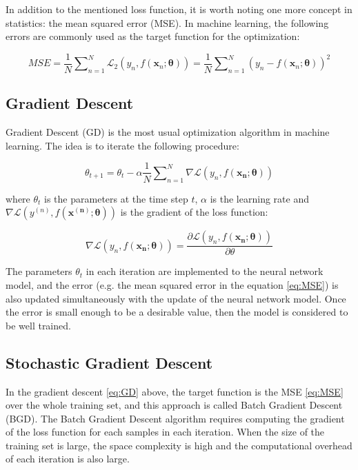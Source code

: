\documentclass[
	parskip, 			   %
	twoside, 			   %
	DIV=14, 			   %
	BCOR=15.0mm, 		   %
	headsepline, 		   %
	open=right, 		   %
	captions=tableheading, %
	bibliography=totoc,    %
	numbers=noenddot       %
]{scrreprt}
\begin{document}
In addition to the mentioned loss function, it is worth noting one more concept in statistics: the mean squared error (MSE). In machine learning, the following errors are commonly used as the target function for the optimization:

\begin{equation}
    \label{eq:MSE}
    MSE = \frac{1}{N} \sum\nolimits_{n=1}^N \mathcal{L}_{2}\left( y_n,f(\mathbf{x}_n;\mathbf{\theta}) \right) = \frac{1}{N} \sum\nolimits_{n=1}^N (y_n-f(\mathbf{x}_n;\mathbf{\theta}))^2
\end{equation}
\subsection{Gradient Descent}
Gradient Descent (GD) is the most usual optimization algorithm in machine learning. The idea is to iterate the following procedure:

\begin{equation}
    \label{eq:GD}
    \theta_{t+1} = \theta_{t} - \alpha \frac{1}{N} \sum\nolimits_{n=1}^N \nabla \mathcal{L}\left( y_{n},f(\mathbf{x_{n}};\mathbf{\theta}) \right)
\end{equation}

where $\theta_{t}$ is the parameters at the time step $t$, $\alpha$ is the learning rate and $\nabla \mathcal{L}\left( y^{(n)},f(\mathbf{x^{(n)}};\mathbf{\theta}) \right)$ is the gradient of the loss function:

\begin{equation}
    \label{eq:Gradient_loss}
    \nabla \mathcal{L}\left( y_{n},f(\mathbf{x_{n}};\mathbf{\theta}) \right) = \frac{\partial \mathcal{L}\left( y_{n},f(\mathbf{x_{n}};\mathbf{\theta}) \right)}{\partial \theta}
\end{equation}

The parameters $\theta_{t}$ in each iteration are implemented to the neural network model, and the error (e.g. the mean squared error in the equation \ref{eq:MSE}) is also updated simultaneously with the update of the neural network model. Once the error is small enough to be a desirable value, then the model is considered to be well trained.

\subsection{Stochastic Gradient Descent}
In the gradient descent \ref{eq:GD} above, the target function is the MSE \ref{eq:MSE} over the whole training set, and this approach is called Batch Gradient Descent (BGD).  The Batch Gradient Descent algorithm requires computing the gradient of the loss function for each samples in each iteration. When the size of the training set is large, the space complexity is high and the computational overhead of each iteration is also large.
\end{document}
